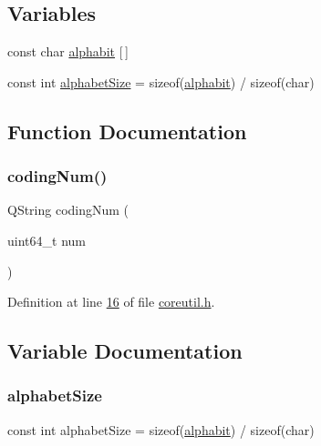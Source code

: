 \subsection*{Variables}
\begin{DoxyCompactItemize}
\item 
const char \hyperlink{a00023_a3ed7c4791ebe4cfc8d3a86ce87ad4b9f}{alphabit} \mbox{[}$\,$\mbox{]}
\item 
const int \hyperlink{a00023_a559b86a589c21442c764bfda2ac04737}{alphabet\+Size} = sizeof(\hyperlink{a00023_a3ed7c4791ebe4cfc8d3a86ce87ad4b9f}{alphabit}) / sizeof(char)
\end{DoxyCompactItemize}


\subsection{Function Documentation}
\mbox{\label{a00023_ac67899e626a301d63a108c03193ca4e1}} 
\subsubsection{\texorpdfstring{coding\+Num()}{codingNum()}}
{\footnotesize\ttfamily Q\+String coding\+Num (\begin{DoxyParamCaption}\item[{uint64\+\_\+t}]{num }\end{DoxyParamCaption})\hspace{0.3cm}{\ttfamily [inline]}}



Definition at line \hyperlink{a00023_source_l00016}{16} of file \hyperlink{a00023_source}{coreutil.\+h}.



\subsection{Variable Documentation}
\mbox{\label{a00023_a559b86a589c21442c764bfda2ac04737}} 
\subsubsection{\texorpdfstring{alphabet\+Size}{alphabetSize}}
{\footnotesize\ttfamily const int alphabet\+Size = sizeof(\hyperlink{a00023_a3ed7c4791ebe4cfc8d3a86ce87ad4b9f}{alphabit}) / sizeof(char)}



